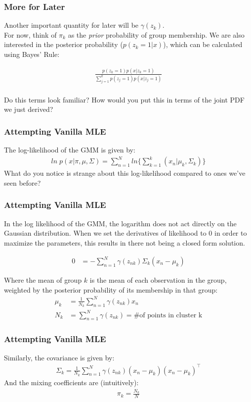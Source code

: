 \documentclass{beamer}
\begin{document}
\begin{frame}
\frametitle{More for Later}
Another important quantity for later will be $\gamma(z_k)$.\\
For now, think of $\pi_k$ as the \textit{prior} probability of group membership. We are also interested in the posterior probability ($p(z_k = 1|x) $), which can be calculated using Bayes' Rule:

\begin{align*}
  \frac{p(z_k = 1) p(x|z_k =1 )}{\sum_{j = 1}^{k} p(z_j = 1) p(x|z_j=1)}\\
\end{align*}

Do this terms look familiar? How would you put this in terms of the joint PDF we just derived?
\end{frame}

\begin{frame}
	\frametitle{Attempting Vanilla MLE}
	The log-likelihood of the GMM is given by:
	\begin{align*}
	ln\; p(x|\pi, \mu, \Sigma) = \sum_{n=1}^{N} ln\{\sum_{k=1}^{k} (x_n | \mu_k, \Sigma_k) \}
	\end{align*}
	What do you notice is strange about this log-likelihood compared to ones we've seen before?
\end{frame}

\begin{frame}
\frametitle{Attempting Vanilla MLE}
	In the log likelihood of the GMM, the logarithm does not act directly on the Gaussian distribution. When we set the derivatives of likelihood to $0$ in order to maximize the parameters, this results in there not being a closed form solution.
	
	\begin{align*}
	 0&= -\sum_{n=1}^{N} \gamma(z_{nk}) \Sigma_k(x_n - \mu_k)
	\end{align*}
	
	Where the mean of group $k$ is the mean of each observation in the group, weighted by the posterior probability of its membership in that group:
	\begin{align*}
		 \mu_k &= \frac{1}{N_k} \sum_{n=1}^{N} \gamma(z_{nk})x_n \\
		 N_k &= \sum_{n=1}^{N} \gamma({z_{nk}}) = \text{\# of points in cluster k}
	\end{align*}
	
\end{frame}

\begin{frame}
\frametitle{Attempting Vanilla MLE}	
	Similarly, the covariance is given by:
	\begin{align*}
	\Sigma_k = \frac{1}{N_k} \sum_{n=1}^{N} \gamma(z_{nk})(x_n - \mu_k)(x_n - \mu_k)^\intercal
	\end{align*}
	And the mixing coefficients are (intuitively):
	\begin{align*}
	\pi_k = \frac{N_k}{N}
	\end{align*}
\end{frame}
\end{document}
